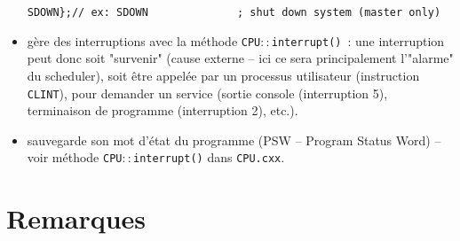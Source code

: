 \documentclass{article}
\begin{document}
\begin{itemize}
\begin{verbatim}
SDOWN};// ex: SDOWN              ; shut down system (master only)
\end{verbatim}
\item g\`ere des interruptions avec la m\'ethode \texttt{CPU$::$interrupt()}~:
  une interruption peut donc soit "survenir" (cause externe -- ici ce sera
  principalement l'"alarme" du scheduler), soit
  \^etre appel\'ee par un processus utilisateur (instruction \texttt{CLINT}),
  pour demander un service (sortie console (interruption 5), terminaison de
  programme (interruption 2), etc.).
\item sauvegarde son mot d'\'etat du programme (PSW -- Program Status Word) --
  voir m\'ethode \texttt{CPU$::$interrupt()} dans \texttt{CPU.cxx}.
\end{itemize}

\section{Remarques}
\end{document}
